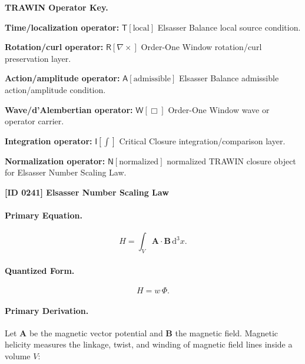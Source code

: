 \par\vspace{0.45\baselineskip}
\noindent\begin{minipage}[t]{\linewidth}
\begingroup
\small
\raggedright
\textbf{TRAWIN Operator Key.}\par
\noindent\textbf{Time/localization operator:} $\mathsf{T}\!\left[\mathrm{local}\right]$ Elsasser Balance local source condition.\par
\noindent\textbf{Rotation/curl operator:} $\mathsf{R}\!\left[\nabla\times\right]$ Order-One Window rotation/curl preservation layer.\par
\noindent\textbf{Action/amplitude operator:} $\mathsf{A}\!\left[\mathrm{admissible}\right]$ Elsasser Balance admissible action/amplitude condition.\par
\noindent\textbf{Wave/d'Alembertian operator:} $\mathsf{W}\!\left[\Box\right]$ Order-One Window wave or operator carrier.\par
\noindent\textbf{Integration operator:} $\mathsf{I}\!\left[\int\right]$ Critical Closure integration/comparison layer.\par
\noindent\textbf{Normalization operator:} $\mathsf{N}\!\left[\mathrm{normalized}\right]$ normalized TRAWIN closure object for Elsasser Number Scaling Law.\par
\endgroup
\end{minipage}

\clearpage
\noindent\textbf{[ID 0241] Elsasser Number Scaling Law}\par
\vspace{0.35em}
\paragraph{Primary Equation.}
\begin{equation}
H
=
\int_V
\mathbf{A}\cdot\mathbf{B}
\,\mathrm{d}^3x .
\end{equation}

\paragraph{Quantized Form.}
\begin{equation}
H=w\,\Phi .
\end{equation}

\paragraph{Primary Derivation.}
Let $\mathbf{A}$ be the magnetic vector potential and $\mathbf{B}$ the magnetic field.  
Magnetic helicity measures the linkage, twist, and winding of magnetic field lines inside a volume $V$:

